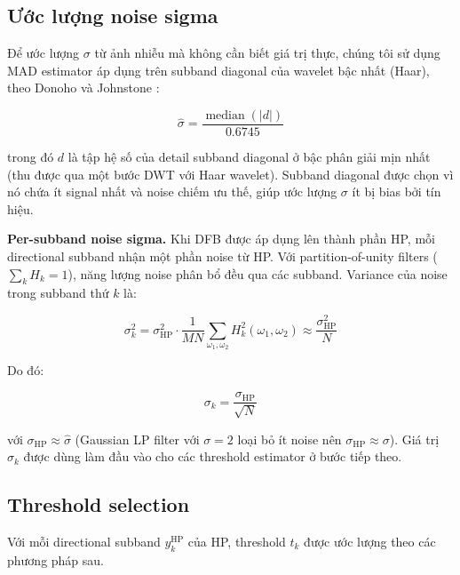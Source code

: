 \subsection{Ước lượng noise sigma}

Để ước lượng $\sigma$ từ ảnh nhiễu mà không cần biết giá trị thực, chúng tôi sử dụng MAD estimator áp dụng trên subband diagonal của wavelet bậc nhất (Haar), theo Donoho và Johnstone \cite{donoho1995}:

\begin{equation}
    \hat{\sigma} = \frac{\operatorname{median}(|d|)}{0.6745}
    \label{eq:sigma_hat}
\end{equation}

trong đó $d$ là tập hệ số của detail subband diagonal ở bậc phân giải mịn nhất (thu được qua một bước DWT với Haar wavelet). Subband diagonal được chọn vì nó chứa ít signal nhất và noise chiếm ưu thế, giúp ước lượng $\sigma$ ít bị bias bởi tín hiệu.

\textbf{Per-subband noise sigma.}
Khi DFB được áp dụng lên thành phần HP, mỗi directional subband nhận một phần noise từ HP. Với partition-of-unity filters ($\sum_k H_k = 1$), năng lượng noise phân bổ đều qua các subband. Variance của noise trong subband thứ $k$ là:

\begin{equation}
    \sigma_k^2 = \sigma_{\text{HP}}^2 \cdot \frac{1}{MN} \sum_{\omega_1, \omega_2} H_k^2(\omega_1, \omega_2) \approx \frac{\sigma_{\text{HP}}^2}{N}
\end{equation}

Do đó:

\begin{equation}
    \sigma_k = \frac{\sigma_{\text{HP}}}{\sqrt{N}}
    \label{eq:sigma_k}
\end{equation}

với $\sigma_{\text{HP}} \approx \hat{\sigma}$ (Gaussian LP filter với $\sigma = 2$ loại bỏ ít noise nên $\sigma_{\text{HP}} \approx \sigma$). Giá trị $\sigma_k$ được dùng làm đầu vào cho các threshold estimator ở bước tiếp theo.

\subsection{Threshold selection}

Với mỗi directional subband $y_k^{\text{HP}}$ của HP, threshold $t_k$ được ước lượng theo các phương pháp sau.

